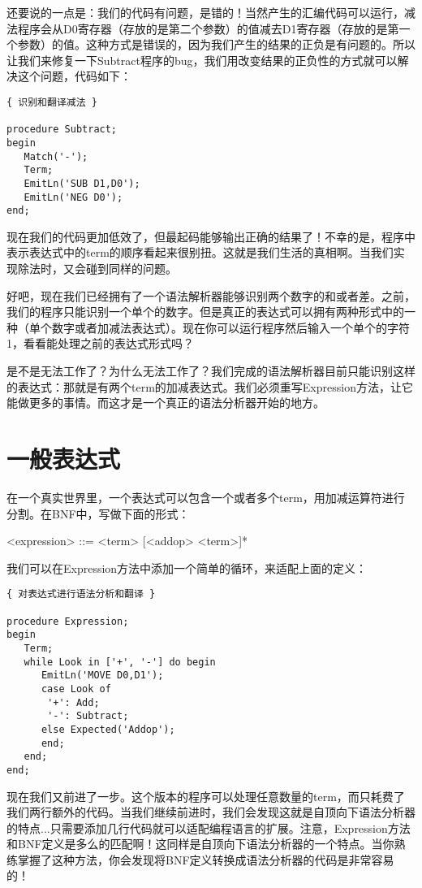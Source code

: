 还要说的一点是：我们的代码有问题，是错的！当然产生的汇编代码可以运行，减法程序会从D0寄存器（存放的是第二个参数）的值减去D1寄存器（存放的是第一个参数）的值。这种方式是错误的，因为我们产生的结果的正负是有问题的。所以让我们来修复一下Subtract程序的bug，我们用改变结果的正负性的方式就可以解决这个问题，代码如下：

\begin{verbatim}
{ 识别和翻译减法 }

procedure Subtract;
begin
   Match('-');
   Term;
   EmitLn('SUB D1,D0');
   EmitLn('NEG D0');
end;
\end{verbatim}

现在我们的代码更加低效了，但最起码能够输出正确的结果了！不幸的是，程序中表示表达式中的term的顺序看起来很别扭。这就是我们生活的真相啊。当我们实现除法时，又会碰到同样的问题。

好吧，现在我们已经拥有了一个语法解析器能够识别两个数字的和或者差。之前，我们的程序只能识别一个单个的数字。但是真正的表达式可以拥有两种形式中的一种（单个数字或者加减法表达式）。现在你可以运行程序然后输入一个单个的字符1，看看能处理之前的表达式形式吗？

是不是无法工作了？为什么无法工作了？我们完成的语法解析器目前只能识别这样的表达式：那就是有两个term的加减表达式。我们必须重写Expression方法，让它能做更多的事情。而这才是一个真正的语法分析器开始的地方。

\section{一般表达式}

在一个真实世界里，一个表达式可以包含一个或者多个term，用加减运算符进行分割。在BNF中，写做下面的形式：

\begin{tcolorbox}
<expression> ::= <term> [<addop> <term>]*
\end{tcolorbox}

我们可以在Expression方法中添加一个简单的循环，来适配上面的定义：

\begin{verbatim}
{ 对表达式进行语法分析和翻译 }

procedure Expression;
begin
   Term;
   while Look in ['+', '-'] do begin
      EmitLn('MOVE D0,D1');
      case Look of
       '+': Add;
       '-': Subtract;
      else Expected('Addop');
      end;
   end;
end;
\end{verbatim}

现在我们又前进了一步。这个版本的程序可以处理任意数量的term，而只耗费了我们两行额外的代码。当我们继续前进时，我们会发现这就是自顶向下语法分析器的特点...只需要添加几行代码就可以适配编程语言的扩展。注意，Expression方法和BNF定义是多么的匹配啊！这同样是自顶向下语法分析器的一个特点。当你熟练掌握了这种方法，你会发现将BNF定义转换成语法分析器的代码是非常容易的！

